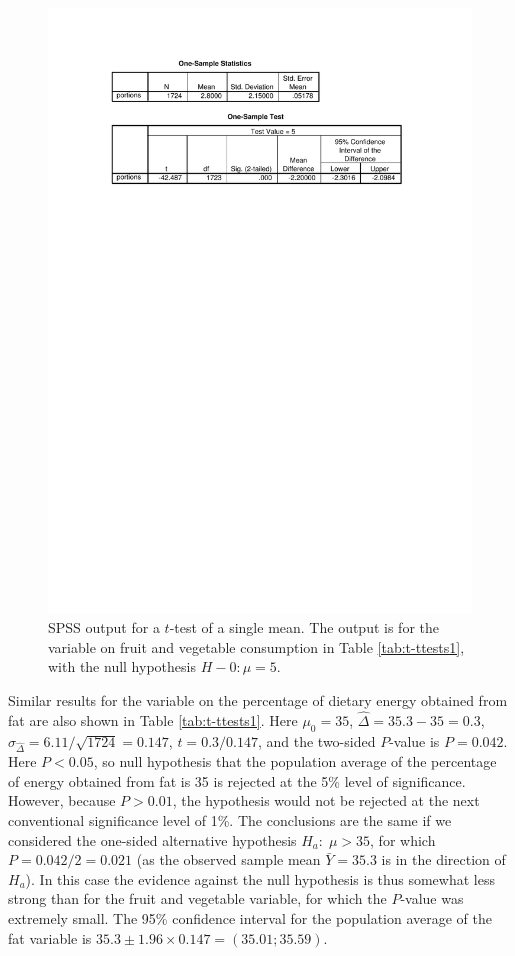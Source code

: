 \documentclass[11pt,a4paper,openany]{book}
\begin{document}
\begin{figure}[htbp]
\centering
\includegraphics[width=13.00000cm]{ttestspss.pdf}
\caption{\label{fig:f-spsstest} SPSS output for a \(t\)-test of a single
mean. The output is for the variable on fruit and vegetable consumption
in Table \ref{tab:t-ttests1}, with the null hypothesis
\(H-{0}: \mu=5\).}
\end{figure}

Similar results for the variable on the percentage of dietary energy
obtained from fat are also shown in Table \ref{tab:t-ttests1}. Here
\(\mu_{0}=35\), \(\hat{\Delta}=35.3-35=0.3\),
\(\hat{\sigma}_{\hat{\Delta}}=6.11/\sqrt{1724}=0.147\), \(t=0.3/0.147\),
and the two-sided \(P\)-value is \(P=0.042\). Here \(P<0.05\), so null
hypothesis that the population average of the percentage of energy
obtained from fat is 35 is rejected at the 5\% level of significance.
However, because \(P>0.01\), the hypothesis would not be rejected at the
next conventional significance level of 1\%. The conclusions are the
same if we considered the one-sided alternative hypothesis
\(H_{a}:\; \mu>35\), for which \(P=0.042/2=0.021\) (as the observed
sample mean \(\bar{Y}=35.3\) is in the direction of \(H_{a}\)). In this
case the evidence against the null hypothesis is thus somewhat less
strong than for the fruit and vegetable variable, for which the
\(P\)-value was extremely small. The 95\% confidence interval for the
population average of the fat variable is
\(35.3\pm 1.96\times 0.147=(35.01; 35.59)\).
\end{document}

